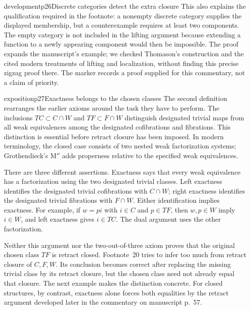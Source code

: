 \begin{dcomment}{development}{p26}{Discrete categories detect the extra closure}
This also explains the qualification required in the footnote: a nonempty discrete category supplies the displayed membership, but a counterexample requires at least two components. The empty category is not included in the lifting argument because extending a function to a newly appearing component would then be impossible. The proof expands the manuscript's example; we checked Thomason's construction and the cited modern treatments of lifting and localization, without finding this precise zigzag proof there. The marker records a proof supplied for this commentary, not a claim of priority.
\end{dcomment}

\begin{dcomment}{exposition}{p27}{Exactness belongs to the chosen classes}
The second definition rearranges the earlier axioms around the task they have to perform. The inclusions $TC\subset C\cap W$ and $TF\subset F\cap W$ distinguish designated trivial maps from all weak equivalences among the designated cofibrations and fibrations. This distinction is essential before retract closure has been imposed. In modern terminology, the closed case consists of two nested weak factorization systems; Grothendieck's $\text{M}''$ adds properness relative to the specified weak equivalences.

There are three different assertions. Exactness says that every weak equivalence has a factorization using the two designated trivial classes. Left exactness identifies the designated trivial cofibrations with $C\cap W$; right exactness identifies the designated trivial fibrations with $F\cap W$. Either identification implies exactness. For example, if $w=pi$ with $i\in C$ and $p\in TF$, then $w,p\in W$ imply $i\in W$, and left exactness gives $i\in TC$. The dual argument uses the other factorization.

Neither this argument nor the two-out-of-three axiom proves that the original chosen class $TF$ is retract closed. Footnote~20 tries to infer too much from retract closure of $C,F,W$. Its conclusion becomes correct after replacing the missing trivial class by its retract closure, but the chosen class need not already equal that closure. The next example makes the distinction concrete. For closed structures, by contrast, exactness alone forces both equalities by the retract argument developed later in the commentary on manuscript p.~57.
\end{dcomment}

